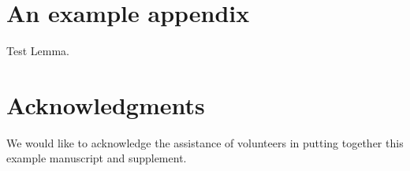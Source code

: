 \documentclass[review,onefignum,onetabnum]{siamart171218}
\begin{document}
%
%
%
%
%
%
%
%
%
%
%

\appendix
\section{An example appendix}


\begin{lemma}
Test Lemma.
\end{lemma}


\section*{Acknowledgments}
We would like to acknowledge the assistance of volunteers in putting
together this example manuscript and supplement.



\end{document}
